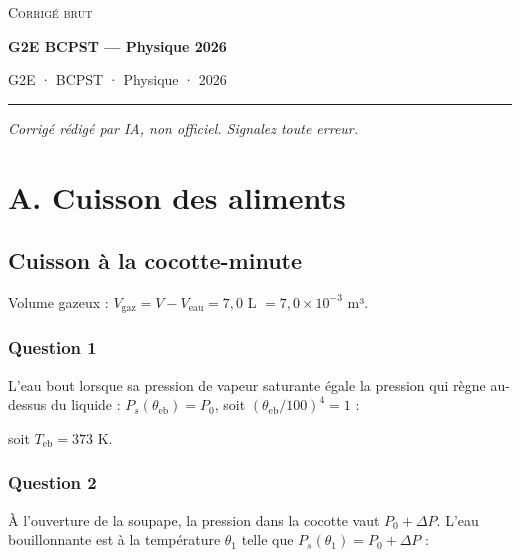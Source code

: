 \documentclass[11pt,a4paper]{article}
\newcommand{\equationajustee}[1]{%
  \sbox{\boiteequation}{$\displaystyle #1$}%
  \ifdim\wd\boiteequation>\linewidth
    \[\resizebox{\linewidth}{!}{\usebox{\boiteequation}}\]%
  \else
    \[#1\]%
  \fi}
\begin{document}
\thispagestyle{plain}
\begin{center}
  {\small\scshape Corrigé brut}\par\smallskip
  {\LARGE\bfseries G2E BCPST — Physique 2026\par}\medskip
  {\large G2E · BCPST · Physique · 2026\par}
\end{center}
\vspace{2pt}\hrule\vspace{8pt}

\emph{Corrigé rédigé par IA, non officiel. Signalez toute erreur.}

\hypertarget{a.-cuisson-des-aliments}{%
\section{A. Cuisson des aliments}\label{a.-cuisson-des-aliments}}

\hypertarget{cuisson-uxe0-la-cocotte-minute}{%
\subsection{Cuisson à la cocotte-minute}\label{cuisson-uxe0-la-cocotte-minute}}

Volume gazeux : \(V_{\mathrm{gaz}}=V-V_{\mathrm{eau}}=7{,}0\) L \(=7{,}0\times10^{-3}\) m³.

\hypertarget{question-1}{%
\subsubsection{Question 1}\label{question-1}}

L'eau bout lorsque sa pression de vapeur saturante égale la pression qui règne au-dessus du liquide : \(P_s(\theta_{\mathrm{eb}})=P_0\), soit \(\left(\theta_{\mathrm{eb}}/100\right)^4=1\) :

\equationajustee{\boxed{\theta_{\mathrm{eb}}=100\ ^\circ\mathrm{C}}}

soit \(T_{\mathrm{eb}}=373\) K.

\hypertarget{question-2}{%
\subsubsection{Question 2}\label{question-2}}

À l'ouverture de la soupape, la pression dans la cocotte vaut \(P_0+\Delta P\). L'eau bouillonnante est à la température \(\theta_1\) telle que \(P_s(\theta_1)=P_0+\Delta P\) :
\end{document}
